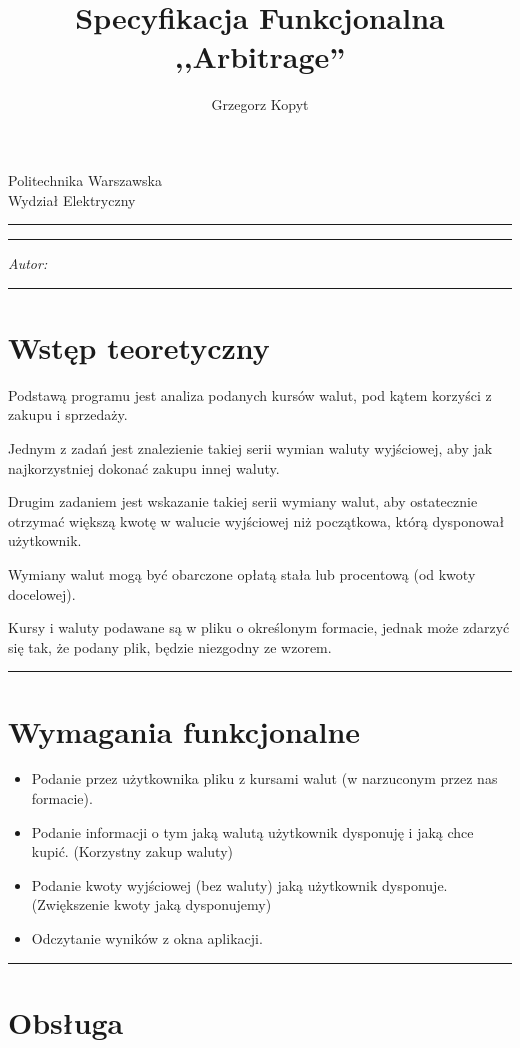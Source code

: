 \documentclass[a4paper,11pt]{article}
\author{Grzegorz Kopyt}
\title{Specyfikacja Funkcjonalna \\
,,Arbitrage''}
\makeatletter
\newcommand{\linia}{\rule{\linewidth}{0.4mm}}
\renewcommand{\maketitle}{\begin{titlepage}
    \vspace*{2cm}
    \begin{center}\LARGE
    Politechnika Warszawska\\
    Wydział Elektryczny\\
    \end{center}
    \vspace{5cm}
    \noindent\linia
    \begin{center}
      \LARGE \textsc{\@title}
         \end{center}
     \linia
    \vspace{0.5cm}
    \begin{flushright}
    \begin{minipage}{5cm}
    \textit{Autor:}\\
    \normalsize \textsc{\@author} \par
    \end{minipage}
    \vspace{5cm}
     \end{flushright}
    \vspace*{\stretch{6}}
    \begin{center}
    \@date
    \end{center}
  \end{titlepage}
}
\makeatother
\begin{document}
\maketitle

\tableofcontents
\vspace{1cm}
\noindent\linia
\section{Wstęp teoretyczny}
Podstawą programu jest analiza podanych kursów walut, pod kątem korzyści z zakupu i sprzedaży.

Jednym z zadań jest znalezienie takiej serii wymian waluty wyjściowej, aby jak najkorzystniej dokonać zakupu innej waluty.

Drugim zadaniem jest wskazanie takiej serii wymiany walut, aby ostatecznie otrzymać większą kwotę w walucie wyjściowej niż początkowa, którą dysponował użytkownik.

Wymiany walut mogą być obarczone opłatą stała lub procentową (od kwoty docelowej).

Kursy i waluty podawane są w pliku o określonym formacie, jednak może zdarzyć się tak, że podany plik, będzie niezgodny ze wzorem.

\noindent\linia
\section{Wymagania funkcjonalne}
\begin{itemize}
\item Podanie przez użytkownika pliku z kursami walut (w narzuconym przez nas formacie).
\item Podanie informacji o tym jaką walutą użytkownik dysponuję  i jaką chce kupić. (Korzystny zakup waluty)
\item Podanie kwoty wyjściowej (bez waluty) jaką użytkownik dysponuje. (Zwiększenie kwoty jaką dysponujemy)
\item Odczytanie wyników z okna aplikacji.
\end{itemize}

\noindent\linia
\section{Obsługa}
\end{document}
